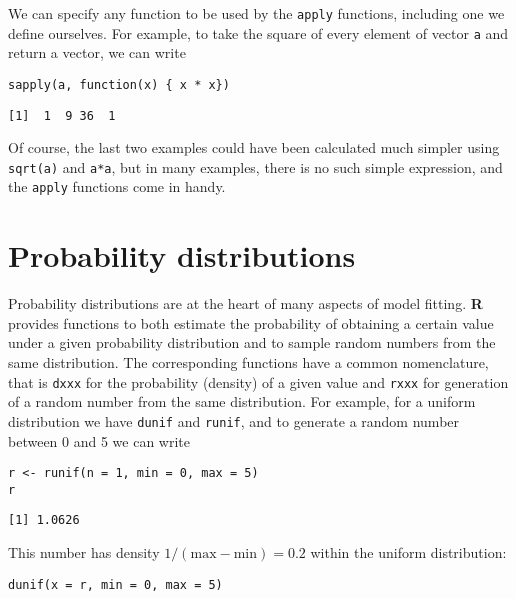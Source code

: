 \documentclass[11pt,a4paper]{article}
\begin{document}
We can specify any function to be used by the \texttt{apply} functions, including one we define ourselves. For example, to take the square of every element of vector \texttt{a} and return a vector, we can write \\

\begin{verbatim}
sapply(a, function(x) { x * x})
\end{verbatim}

\begin{verbatim}
[1]  1  9 36  1
\end{verbatim}

Of course, the last two examples could have been calculated much simpler using \texttt{sqrt(a)} and \texttt{a*a}, but in many examples, there is no such simple expression, and the \texttt{apply} functions come in handy. \\

\section{Probability distributions}
\label{sec-5}

Probability distributions are at the heart of many aspects of model fitting. \textbf{R} provides functions to both estimate the probability of obtaining a certain value under a given probability distribution and to sample random numbers from the same distribution. The corresponding functions have a common nomenclature, that is \verb~dxxx~ for the probability (density) of a given value and \verb~rxxx~ for generation of a random number from the same distribution. For example, for a uniform distribution we have \verb~dunif~ and \verb~runif~, and to generate a random number between 0 and 5 we can write \\

\begin{verbatim}
r <- runif(n = 1, min = 0, max = 5)
r
\end{verbatim}

\begin{verbatim}
[1] 1.0626
\end{verbatim}

This number has density $1/(\mathrm{max}-\mathrm{min})=0.2$ within the uniform distribution: \\

\begin{verbatim}
dunif(x = r, min = 0, max = 5)
\end{verbatim}
\end{document}

